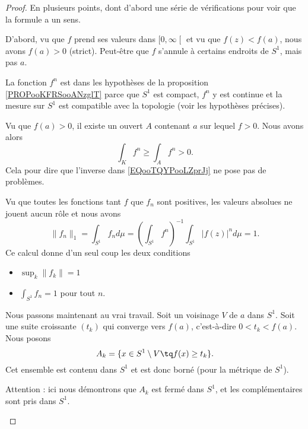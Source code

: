 \begin{proof}
    En plusieurs points, dont d'abord une série de vérifications pour voir que la formule a un sens.
    \begin{subproof}
    \item[Strictement positive]
    D'abord, vu que \( f\) prend ses valeurs dans \( \mathopen[ 0 , \infty \mathclose[\) et vu que \( f(z)<f(a)\), nous avons \( f(a)>0\) (strict). Peut-être que \( f\) s'annule à certains endroits de \( S^1\), mais pas \( a\).
    \item[\( f^n\) est intégrable sur \( S^1\)]
        La fonction \( f^n\) est dans les hypothèses de la proposition \ref{PROPooKFRSooANzglT} parce que \( S^1\) est compact, \( f^n\) y est continue et la mesure sur \( S^1\) est compatible avec la topologie (voir les hypothèses précises).
    \item[L'intégrale n'est pas nulle]
        Vu que \( f(a)>0\), il existe un ouvert \( A\) contenant \( a\) sur lequel \( f>0\). Nous avons alors
        \begin{equation}
            \int_Kf^n\geq \int_Af^n>0.
        \end{equation}
        Cela pour dire que l'inverse dans \eqref{EQooTQYPooLZprJj} ne pose pas de problèmes.
    \item[Norme]
        Vu que toutes les fonctions tant \( f\) que \( f_n\) sont positives, les valeurs absolues ne jouent aucun rôle et nous avons
        \begin{equation}
            \| f_n \|_1=\int_{S^1}f_nd\mu=\left( \int_{S^1}f^n \right)^{-1}\int_{S^1}| f(z) |^nd\mu=1.
        \end{equation}
        Ce calcul donne d'un seul coup les deux conditions
        \begin{itemize}
            \item \( \sup_k\| f_k \|=1\)
            \item \( \int_{S^1}f_n=1\) pour tout \( n\).
        \end{itemize}
    \end{subproof}
    Nous passons maintenant au vrai travail.
    Soit un voisinage \( V\) de \( a\) dans \( S^1\). Soit une suite croissante \( (t_k)\) qui converge vers \( f(a)\), c'est-à-dire \( 0<t_k<f(a)\). Nous posons
    \begin{equation}
        A_k=\{ x\in S^1\setminus V\tq f(x)\geq t_k \}.
    \end{equation}
    Cet ensemble est contenu dans \( S^1\) et est donc borné (pour la métrique de \( S^1\)).    
    \begin{subproof}
    \item[\( A_k\) est fermé]
        Attention : ici nous démontrons que \( A_k\) est fermé dans \( S^1\), et les complémentaires sont pris dans \( S^1\).


\end{subproof}
\end{proof}
